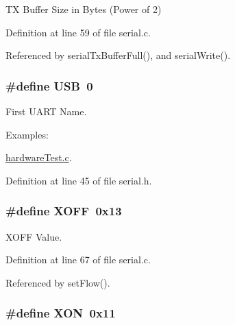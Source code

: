 T\-X Buffer Size in Bytes (Power of 2) 



Definition at line 59 of file serial.\-c.



Referenced by serial\-Tx\-Buffer\-Full(), and serial\-Write().

\hypertarget{group__uart_ga779bf099075a999d1074357fccbd466b}{
\subsubsection[{U\-S\-B}]{\setlength{\rightskip}{0pt plus 5cm}\#define U\-S\-B~0}}\label{group__uart_ga779bf099075a999d1074357fccbd466b}


First U\-A\-R\-T Name. 

\begin{Desc}
\item[Examples\-: ]\par
\hyperlink{hardware_test_8c-example}{hardware\-Test.\-c}.\end{Desc}


Definition at line 45 of file serial.\-h.

\hypertarget{group__uart_ga67fd78ae15d2b67c10d44d69a49ab1c5}{
\subsubsection[{X\-O\-F\-F}]{\setlength{\rightskip}{0pt plus 5cm}\#define X\-O\-F\-F~0x13}}\label{group__uart_ga67fd78ae15d2b67c10d44d69a49ab1c5}


X\-O\-F\-F Value. 



Definition at line 67 of file serial.\-c.



Referenced by set\-Flow().

\hypertarget{group__uart_gacdf721774c51e08c6609e6fa8cf82cc9}{
\subsubsection[{X\-O\-N}]{\setlength{\rightskip}{0pt plus 5cm}\#define X\-O\-N~0x11}}\label{group__uart_gacdf721774c51e08c6609e6fa8cf82cc9}


